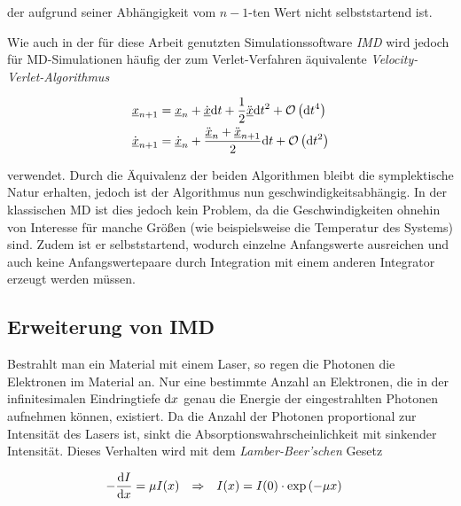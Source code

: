 		der aufgrund seiner Abhängigkeit vom $n-1$-ten Wert nicht selbststartend ist.

		Wie auch in der für diese Arbeit genutzten Simulationssoftware \emph{IMD}
		\cite{stadler1997imd} wird jedoch für MD-Simulationen häufig der zum Verlet-Verfahren
		äquivalente \emph{Velocity-Verlet-Algorithmus}

		\begin{align}
			\uvec{x}_{n+1} &= \uvec{x}_n + \dot{\uvec{x}}\dt
				+ \frac{1}{2}\ddot{\uvec{x}}\dt^2 + \BigO\left(\dt^4\right) \nonumber\\
			\dot{\uvec{x}}_{n+1} &= \dot{\uvec{x}}_n + \frac{\ddot{\uvec{x}}_n +
				\ddot{\uvec{x}}_{n+1}}{2}\dt + \BigO\left(\dt^2\right)
				\label{eq:velocity_verlet}
		\end{align}

		verwendet. Durch die Äquivalenz der beiden Algorithmen bleibt die symplektische Natur
		erhalten, jedoch ist der Algorithmus nun geschwindigkeitsabhängig. In der klassischen MD
		ist dies jedoch kein Problem, da die Geschwindigkeiten ohnehin von Interesse für manche
		Größen (wie beispielsweise die Temperatur des Systems) sind. Zudem ist er selbststartend,
		wodurch einzelne Anfangswerte ausreichen und auch keine Anfangswertepaare durch
		Integration mit einem anderen Integrator erzeugt werden müssen.

	\subsection{Erweiterung von IMD} %
		Bestrahlt man ein Material mit einem Laser, so regen die Photonen die Elektronen im
		Material an. Nur eine bestimmte Anzahl an Elektronen, die in der infinitesimalen
		Eindringtiefe $\dx$ genau die Energie der eingestrahlten Photonen aufnehmen können,
		existiert. Da die Anzahl der Photonen proportional zur Intensität des Lasers ist, sinkt
		die Absorptionswahrscheinlichkeit mit sinkender Intensität. Dieses Verhalten wird mit dem
		\emph{Lamber-Beer'schen} Gesetz

		\begin{align}
			-\frac{\dx[I]}{\dx[x]} &= \mu I(x)
			&\Rightarrow&&
			I(x) &= I(0) \cdot \exp\left(-\mu x\right)
		\end{align}

